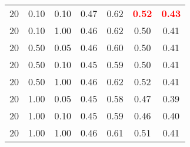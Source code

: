 \begin{tabular}{lllcccc}
20 & 0.10 & 0.10 & 0.47 & 0.62 & \textbf{\textcolor{red}{0.52}} & \textbf{\textcolor{red}{0.43}} \\ 
20 & 0.10 & 1.00 & 0.46 & 0.62 & 0.50 & 0.41 \\ 
20 & 0.50 & 0.05 & 0.46 & 0.60 & 0.50 & 0.41 \\ 
20 & 0.50 & 0.10 & 0.45 & 0.59 & 0.50 & 0.41 \\ 
20 & 0.50 & 1.00 & 0.46 & 0.62 & 0.52 & 0.41 \\ 
20 & 1.00 & 0.05 & 0.45 & 0.58 & 0.47 & 0.39 \\ 
20 & 1.00 & 0.10 & 0.45 & 0.59 & 0.46 & 0.40 \\ 
20 & 1.00 & 1.00 & 0.46 & 0.61 & 0.51 & 0.41 \\ 
\end{tabular} 
